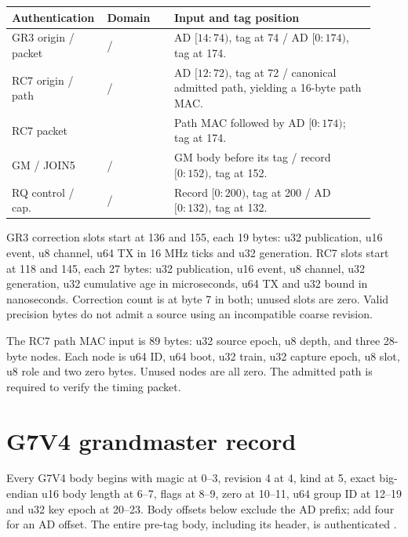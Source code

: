 \documentclass[11pt,letterpaper]{article}
\begin{document}
\begin{center}\small
\begin{tabular}{@{}L{0.20\linewidth}L{0.18\linewidth}L{0.54\linewidth}@{}}\toprule
Authentication & Domain & Input and tag position\\\midrule
GR3 origin / packet &  /  & AD $[14:74)$, tag at 74 / AD $[0:174)$, tag at 174.\\
RC7 origin / path &  /  & AD $[12:72)$, tag at 72 / canonical admitted path, yielding a 16-byte path MAC.\\
RC7 packet &  & Path MAC followed by AD $[0:174)$; tag at 174.\\
GM / JOIN5 &  /  & GM body before its tag / record $[0:152)$, tag at 152.\\
RQ control / cap. &  /  & Record $[0:200)$, tag at 200 / AD $[0:132)$, tag at 132.\\
\bottomrule\end{tabular}\end{center}

GR3 correction slots start at 136 and 155, each 19 bytes: u32 publication, u16 event, u8 channel, u64 TX in 16 MHz ticks and u32 generation. RC7 slots start at 118 and 145, each 27 bytes: u32 publication, u16 event, u8 channel, u32 generation, u32 cumulative age in microseconds, u64 TX and u32 bound in nanoseconds. Correction count is at byte 7 in both; unused slots are zero. Valid precision bytes do not admit a source using an incompatible coarse revision.

The RC7 path MAC input is 89 bytes: u32 source epoch, u8 depth, and three 28-byte nodes. Each node is u64 ID, u64 boot, u32 train, u32 capture epoch, u8 slot, u8 role and two zero bytes. Unused nodes are all zero. The admitted path is required to verify the timing packet.

\page
\section{G7V4 grandmaster record}
Every G7V4 body begins with magic at 0--3, revision 4 at 4, kind at 5, exact big-endian u16 body length at 6--7, flags at 8--9, zero at 10--11, u64 group ID at 12--19 and u32 key epoch at 20--23. Body offsets below exclude the AD prefix; add four for an AD offset. The entire pre-tag body, including its header, is authenticated \cite{wire,tz}.
\end{document}
